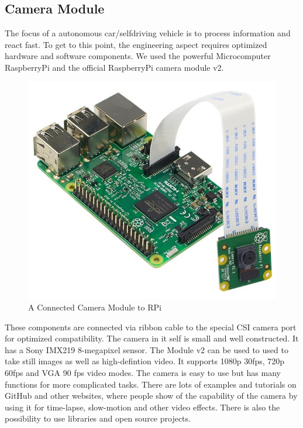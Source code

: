 \documentclass[conference]{IEEEtran}
\begin{document}
\subsection{Camera Module}
The focus of a autonomous car/selfdriving vehicle is to process information and react fast. To get to this point, the engineering aspect requires optimized hardware and software components. We used the powerful Microcomputer RaspberryPi and the official RaspberryPi camera module v2. 
\begin{figure}[h!]
	\includegraphics[width=\linewidth]{CameraModule.png}
	\caption{A Connected Camera Module to RPi}
	\label{fig:CMRPi}
\end{figure}
These components are connected via ribbon cable to the special CSI camera port for optimized compatibility. The camera in it self is small and well constructed. It has a Sony IMX219 8-megapixel sensor. The Module v2 can be used to used to take still images as well as high-defintion video. It supports  1080p 30fps, 720p 60fps and VGA 90 fps video modes. The camera is easy to use but has many functions for more complicated tasks. There are lots of examples and tutorials on GitHub and other websites, where people show of the capability of the camera by using it for time-lapse, slow-motion and other video effects. There is also the possibility to use libraries and open source projects. 
\newline
\end{document}
